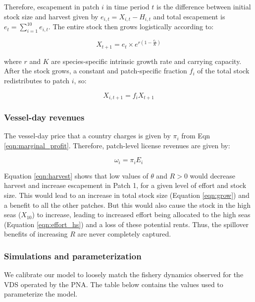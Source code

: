 \documentclass[12pt]{article}
\begin{document}
\noindent Therefore, escapement in patch $i$ in time period $t$ is the difference between initial stock size and harvest given by $e_{i,t} = X_{i,t} - H_{i,t}$ and total escapement is $e_t=\sum_{i=1}^{10}e_{i,t}$. The entire stock then grows logistically according to:

\begin{equation}
X_{t+1} = e_t \times  e^{r \left(1 - \frac{e_t}{K} \right)}
\label{eqn:grow}
\end{equation}

\noindent where $r$ and $K$ are species-specific intrinsic growth rate and carrying capacity. After the stock grows, a constant and patch-specific fraction $f_i$ of the total stock redistributes to patch $i$, so:

\begin{equation}
X_{i,t+1} = f_iX_{t+1}
\label{eqn:disperse}
\end{equation}

\subsubsection{Vessel-day revenues}

The vessel-day price that a country charges is given by $\pi_i$ from Eqn \ref{eqn:marginal_profit}. Therefore, patch-level license revenues are given by:

\begin{equation}
\omega_i = \pi_iE_i
\label{eqn:license_revenue}
\end{equation}

\noindent Equation \ref{eqn:harvest} shows that low values of $\theta$ and $R > 0$ would decrease harvest and increase escapement in Patch 1, for a given level of effort and stock size. This would lead to an increase in total stock size (Equation \ref{eqn:grow}) and a benefit to all the other patches. But this would also cause the stock in the high seas ($X_{10}$) to increase, leading to increased effort being allocated to the high seas (Equation \ref{eqn:effort_hs}) and a loss of these potential rents. Thus, the spillover benefits of increasing $R$ are never completely captured.

\subsubsection{Simulations and parameterization}

We calibrate our model to loosely match the fishery dynamics observed for the VDS operated by the PNA. The table below contains the values used to parameterize the model.
\end{document}

